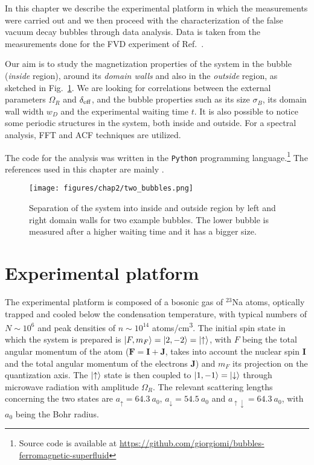 In this chapter we describe the experimental platform in which the measurements were carried out and we then proceed with the characterization of the false vacuum decay bubbles through data analysis. Data is taken from the measurements done for the FVD experiment of Ref.\ \cite{zenesini2024false}. 

Our aim is to study the magnetization properties of the system in the bubble (\emph{inside} region), around its \emph{domain walls} and also in the \emph{outside} region, as sketched in Fig.\ \ref{fig:2bubbles}. 
We are looking for correlations between the external parameters $\Omega_R$ and $\delta_{\rm eff}$, and the bubble properties such as its size $\sigma_B$, its domain wall width $w_D$ and the experimental waiting time $t$. It is also possible to notice some periodic structures in the system, both inside and outside. 
For a spectral analysis, FFT and ACF techniques are utilized. 

The code for the analysis was written in the \texttt{Python} programming language.\footnote{Source code is available at \url{https://github.com/giorgiomi/bubbles-ferromagnetic-superfluid}} The references used in this chapter are mainly \cite{cominotti2023ferro,farolfi2021,cominotti2023experiments,cominotti2024ultracold}.

\begin{figure}[ht!]
    \centering
    \texttt{[image: figures/chap2/two\_bubbles.png]}
    \caption{Separation of the system into inside and outside region by left and right domain walls for two example bubbles. The lower bubble is measured after a higher waiting time and it has a bigger size.}
    \label{fig:2bubbles}
\end{figure}

\section{Experimental platform}
The experimental platform is composed of a bosonic gas of $^{23}$Na atoms, optically trapped and cooled below the condensation temperature, with typical numbers of $N \sim 10^6$ and peak densities of $n \sim 10^{14}$ atoms/\unit{\centi\meter\cubed}. The initial spin state in which the system is prepared is $\ket{F, m_F} = \ket{2, -2} = \ket{\uparrow}$, with $F$ being the total angular momentum of the atom 
($\mathbf{F} = \mathbf{I} + \mathbf{J}$, takes into account the nuclear spin $\mathbf{I}$ and the total angular momentum of the electrons $\mathbf{J}$) 
and $m_F$ its projection on the quantization axis. The $\ket{\uparrow}$ state is then coupled to $\ket{1, -1} = \ket{\downarrow}$ through microwave radiation with amplitude $\Omega_R$. The relevant scattering lengths concerning the two states are $a_\uparrow = 64.3\ a_0$, $a_\downarrow = 54.5\ a_0$ and $a_{\uparrow\downarrow} = 64.3\ a_0$, with $a_0$ being the Bohr radius.

